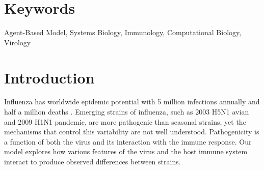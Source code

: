 \documentclass[preprint,10pt,numbers]{elsarticle}
\begin{document}



\section*{Keywords}

Agent-Based Model, Systems Biology, Immunology, Computational Biology, Virology


\section*{Introduction}

Influenza has worldwide epidemic potential with 5 million infections annually and half a million deaths \citep{Who2009}.  Emerging strains of influenza, such as 2003 H5N1 avian and 2009 H1N1 pandemic, are more pathogenic than seasonal strains, yet the mechanisms that control this variability are not well understood.  Pathogenicity is a function of both the virus and its interaction with the immune response. Our model explores how various features of the virus and the host immune system interact to produce observed differences between strains.
\end{document}
